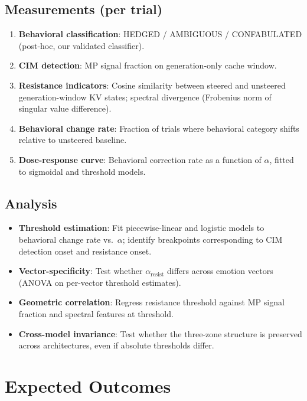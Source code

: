 \documentclass[11pt,letterpaper]{article}
\begin{document}
\subsection{Measurements (per trial)}

\begin{enumerate}[nosep]
  \item \textbf{Behavioral classification}: HEDGED / AMBIGUOUS / CONFABULATED (post-hoc, our validated classifier).
  \item \textbf{CIM detection}: MP signal fraction on generation-only cache window.
  \item \textbf{Resistance indicators}: Cosine similarity between steered and unsteered generation-window KV states; spectral divergence (Frobenius norm of singular value difference).
  \item \textbf{Behavioral change rate}: Fraction of trials where behavioral category shifts relative to unsteered baseline.
  \item \textbf{Dose-response curve}: Behavioral correction rate as a function of $\alpha$, fitted to sigmoidal and threshold models.
\end{enumerate}

\subsection{Analysis}

\begin{itemize}[nosep]
  \item \textbf{Threshold estimation}: Fit piecewise-linear and logistic models to behavioral change rate vs.\ $\alpha$; identify breakpoints corresponding to CIM detection onset and resistance onset.
  \item \textbf{Vector-specificity}: Test whether $\alpha_{\text{resist}}$ differs across emotion vectors (ANOVA on per-vector threshold estimates).
  \item \textbf{Geometric correlation}: Regress resistance threshold against MP signal fraction and spectral features at threshold.
  \item \textbf{Cross-model invariance}: Test whether the three-zone structure is preserved across architectures, even if absolute thresholds differ.
\end{itemize}

\section{Expected Outcomes}
\end{document}
